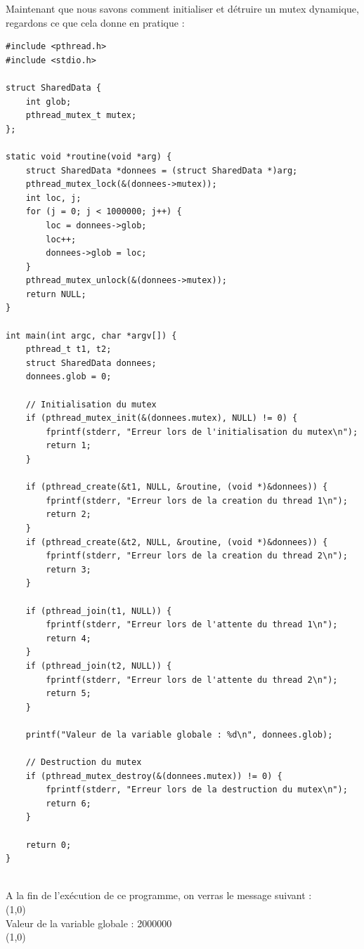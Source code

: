 Maintenant que nous savons comment initialiser et détruire un mutex dynamique, regardons ce que cela donne en pratique : 
\vspace{\baselineskip}
\begin{lstlisting}[title = Code mutex dynamique]
#include <pthread.h>
#include <stdio.h>

struct SharedData {
    int glob;
    pthread_mutex_t mutex;
};

static void *routine(void *arg) {
    struct SharedData *donnees = (struct SharedData *)arg;
    pthread_mutex_lock(&(donnees->mutex));
    int loc, j;
    for (j = 0; j < 1000000; j++) {
        loc = donnees->glob;
        loc++;
        donnees->glob = loc;
    }
    pthread_mutex_unlock(&(donnees->mutex));
    return NULL;
}

int main(int argc, char *argv[]) {
    pthread_t t1, t2;
    struct SharedData donnees;
    donnees.glob = 0;

    // Initialisation du mutex
    if (pthread_mutex_init(&(donnees.mutex), NULL) != 0) {
        fprintf(stderr, "Erreur lors de l'initialisation du mutex\n");
        return 1;
    }

    if (pthread_create(&t1, NULL, &routine, (void *)&donnees)) {
        fprintf(stderr, "Erreur lors de la creation du thread 1\n");
        return 2;
    }
    if (pthread_create(&t2, NULL, &routine, (void *)&donnees)) {
        fprintf(stderr, "Erreur lors de la creation du thread 2\n");
        return 3;
    }

    if (pthread_join(t1, NULL)) {
        fprintf(stderr, "Erreur lors de l'attente du thread 1\n");
        return 4;
    }
    if (pthread_join(t2, NULL)) {
        fprintf(stderr, "Erreur lors de l'attente du thread 2\n");
        return 5;
    }

    printf("Valeur de la variable globale : %d\n", donnees.glob);

    // Destruction du mutex
    if (pthread_mutex_destroy(&(donnees.mutex)) != 0) {
        fprintf(stderr, "Erreur lors de la destruction du mutex\n");
        return 6;
    }

    return 0;
}


\end{lstlisting}   
\vspace{\baselineskip}

A la fin de l'exécution de ce programme, on verras le message suivant : 
\\
\line(1,0){\linewidth}
\\
Valeur de la variable globale : 2000000
\\
\line(1,0){\linewidth}

